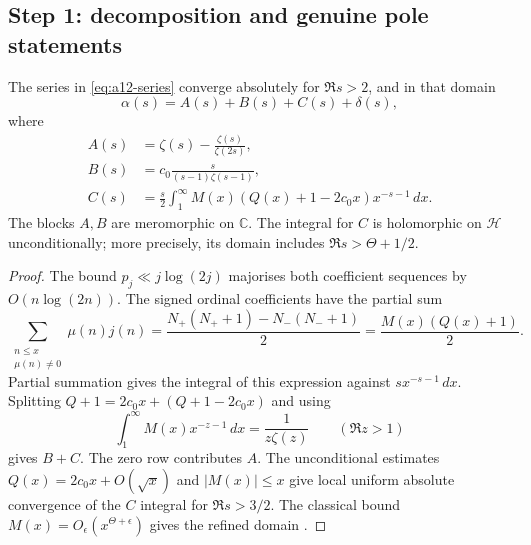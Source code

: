 \subsection{Step 1: decomposition and genuine pole statements}
\label{subsec:a12-decomposition}

\begin{proposition}
\label{prop:a12-decomposition}
The series in \eqref{eq:a12-series} converge absolutely for $\Re s>2$,
and in that domain
\begin{equation}
\label{eq:a12-ABCD}
\boxed{\alpha(s)=A(s)+B(s)+C(s)+\delta(s),}
\end{equation}
where
\begin{align}
A(s)&=\zeta(s)-\frac{\zeta(s)}{\zeta(2s)},\label{eq:a12-A}\\
B(s)&=c_0\frac{s}{(s-1)\zeta(s-1)},\label{eq:a12-B}\\
C(s)&=\frac{s}{2}\int_1^\infty
M(x)(Q(x)+1-2c_0x)x^{-s-1}\,dx.\label{eq:a12-C}
\end{align}
The blocks $A,B$ are meromorphic on $\mathbb C$.
The integral for $C$ is holomorphic on $\mathcal H$ unconditionally;
more precisely, its domain includes $\Re s>\Theta+1/2$.
\end{proposition}
\begin{proof}
The bound $p_j\ll j\log(2j)$ majorises both coefficient sequences by
$O(n\log(2n))$. The signed ordinal coefficients have the partial sum
\begin{equation}
\label{eq:a12-ordinal}
\sum_{\substack{n\le x\\\mu(n)\ne0}}\mu(n)j(n)
=\frac{N_+(N_++1)-N_-(N_-+1)}2=\frac{M(x)(Q(x)+1)}2.
\end{equation}
Partial summation gives the integral of this expression against
$sx^{-s-1}\,dx$. Splitting $Q+1=2c_0x+(Q+1-2c_0x)$ and using
\begin{equation}
\label{eq:a12-Mellin}
\int_1^\infty M(x)x^{-z-1}\,dx=\frac1{z\zeta(z)}
\qquad(\Re z>1)
\end{equation}
gives $B+C$. The zero row contributes $A$.
The unconditional estimates $Q(x)=2c_0x+O(\sqrt x)$ and $|M(x)|\le x$
give local uniform absolute convergence of the $C$ integral for $\Re s>3/2$.
The classical bound $M(x)=O_\epsilon(x^{\Theta+\epsilon})$ gives the
refined domain \cite{Titchmarsh1986}.
\end{proof}

